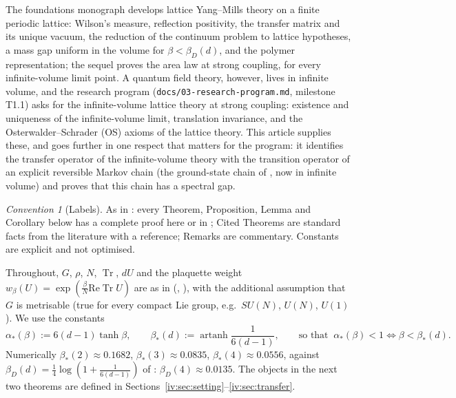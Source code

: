 \documentclass[11pt,a4paper]{article}
\theoremstyle{definition}
\theoremstyle{remark}
\newtheorem{convention}[theorem]{Convention}
\DeclareMathOperator{\Tr}{Tr}
\DeclareMathOperator{\artanh}{artanh}
\newcommand{\Fref}[3]{\cite[#1~`#2' (\texttt{#3})]{F}}
\newcommand{\Flab}[2]{\cite[#1 \texttt{#2}]{F}}
\newcommand{\Fname}[2]{\cite[#1~`#2']{F}}
\newcommand{\aS}{\alpha_*}
\newcommand{\bS}{\beta_*}
\begin{document}
The foundations monograph \cite{F} develops lattice Yang--Mills theory on a finite periodic lattice: Wilson's measure,
reflection positivity, the transfer matrix and its unique vacuum, the reduction of the continuum problem to lattice
hypotheses, a mass gap uniform in the volume for $\beta<\beta_D(d)$, and the polymer representation; the sequel
\cite{III} proves the area law at strong coupling, for every infinite-volume limit point. A quantum field theory, however,
lives in infinite volume, and the research program (\texttt{docs/03-research-program.md}, milestone T1.1) asks for the
infinite-volume lattice theory at strong coupling: existence and uniqueness of the infinite-volume limit, translation
invariance, and the Osterwalder--Schrader (OS) axioms of the lattice theory. This article supplies these, and goes
further in one respect that matters for the program: it identifies the transfer operator of the infinite-volume theory
with the transition operator of an explicit reversible Markov chain (the ground-state chain of
\Fref{Theorem}{Exact reformulation of the gap}{thm:chain}, now in infinite volume) and proves that this chain has a
spectral gap.

\begin{convention}[Labels]
As in \Fname{Convention}{Labels}: every Theorem, Proposition, Lemma and Corollary below has a complete proof here or in
\cite{F}; Cited Theorems are standard facts from the literature with a reference; Remarks are commentary. Constants are
explicit and not optimised.
\end{convention}

Throughout, $G$, $\rho$, $N$, $\Tr$, $dU$ and the plaquette weight $w_\beta(U)=\exp(\frac\beta N\mathrm{Re}\Tr U)$ are as in
\cite{F} (\Fname{Convention}{Group}, \Flab{eq.}{eq:w}), with the additional assumption that $G$ is metrisable (true for
every compact Lie group, e.g.\ $SU(N)$, $U(N)$, $U(1)$). We use the constants
\begin{equation}\label{iv:eq:constants}
\aS(\beta):=6(d-1)\tanh\beta,\qquad \bS(d):=\artanh\frac1{6(d-1)},\qquad\text{so that }\ \aS(\beta)<1\iff\beta<\bS(d).
\end{equation}
Numerically $\bS(2)\approx0.1682$, $\bS(3)\approx0.0835$, $\bS(4)\approx0.0556$, against
$\beta_D(d)=\frac14\log(1+\frac1{6(d-1)})$ of \Fref{Theorem}{Strong-coupling clustering and mass gap, uniform in the
volume}{thm:strong}: $\beta_D(4)\approx0.0135$. The objects in the next two theorems are defined in
Sections~\ref{iv:sec:setting}--\ref{iv:sec:transfer}.
\end{document}
